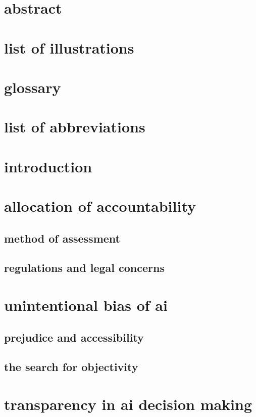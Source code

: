 \documentclass[letterpaper,11pt]{reportOutline} %
\begin{document}
\section*{abstract}

\section*{list of illustrations}

\section*{glossary}

\section*{list of abbreviations}

\section{introduction}

\section{allocation of accountability}
\subsection{method of assessment}
\subsection{regulations and legal concerns}

\section{unintentional bias of ai}
\subsection{prejudice and accessibility}
\subsection{the search for objectivity}

\section{transparency in ai decision making}
\end{document}
